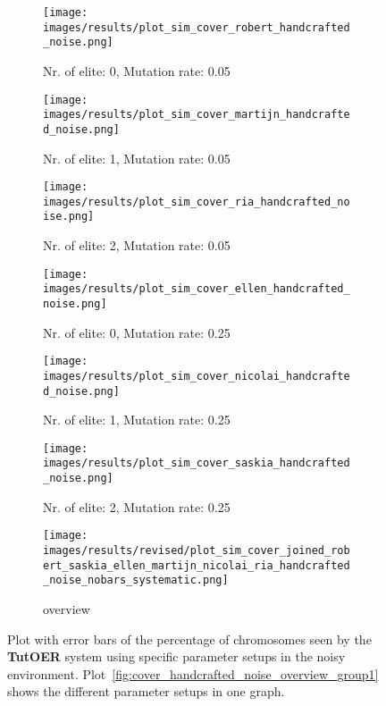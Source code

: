\begin{figure}[ht]
	\begin{subfigure}{0.48\linewidth}
	\texttt{[image: images/results/plot\_sim\_cover\_robert\_handcrafted\_noise.png]}
	\caption{Nr. of elite: 0, Mutation rate: 0.05}
	\label{fig:cover_handcrafted_noise_robert}
	\end{subfigure}
	\hfill
	\begin{subfigure}{0.48\linewidth}
	\texttt{[image: images/results/plot\_sim\_cover\_martijn\_handcrafted\_noise.png]}
	\caption{Nr. of elite: 1, Mutation rate: 0.05}
	\label{fig:cover_handcrafted_noise_martijn}
	\end{subfigure}
	\begin{subfigure}{0.48\linewidth}
	\texttt{[image: images/results/plot\_sim\_cover\_ria\_handcrafted\_noise.png]}
	\caption{Nr. of elite: 2, Mutation rate: 0.05}
	\label{fig:cover_handcrafted_noise_ria}
	\end{subfigure}
	\hfill
	\begin{subfigure}{0.48\linewidth}
	\texttt{[image: images/results/plot\_sim\_cover\_ellen\_handcrafted\_noise.png]}
	\caption{Nr. of elite: 0, Mutation rate: 0.25}
	\label{fig:cover_handcrafted_noise_ellen}
	\end{subfigure}
	\begin{subfigure}{0.48\linewidth}
	\texttt{[image: images/results/plot\_sim\_cover\_nicolai\_handcrafted\_noise.png]}
	\caption{Nr. of elite: 1, Mutation rate: 0.25}
	\label{fig:cover_handcrafted_noise_nicolai}
	\end{subfigure}
	\hfill
	\begin{subfigure}{0.48\linewidth}
	\texttt{[image: images/results/plot\_sim\_cover\_saskia\_handcrafted\_noise.png]}
	\caption{Nr. of elite: 2, Mutation rate: 0.25}
	\label{fig:cover_handcrafted_noise_saskia}
	\end{subfigure}
	\begin{subfigure}{\linewidth}
	\texttt{[image: images/results/revised/plot\_sim\_cover\_joined\_robert\_saskia\_ellen\_martijn\_nicolai\_ria\_handcrafted\_noise\_nobars\_systematic.png]}
	\caption{overview}
	\label{fig:cover_handcrafted_noise_overview_group2}
	\end{subfigure}
	\caption[Percentage chromosomes seen in noisy simulated environment for
	group 1]{Plot with error bars of the percentage of chromosomes seen by the \textbf{TutOER}
	system using specific parameter setups in the noisy environment.
	Plot~\ref{fig:cover_handcrafted_noise_overview_group1} shows the
	different parameter setups in one graph.}
	\label{fig:cover_handcrafted_noise_container_group2}
\end{figure}
